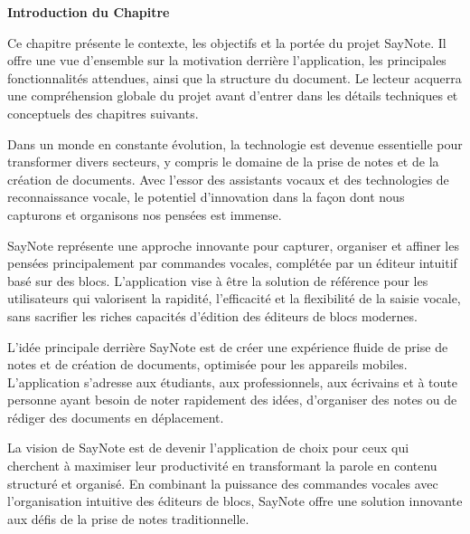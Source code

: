 
\begin{center}
\textbf{\large Introduction du Chapitre}
\end{center}

\noindent
Ce chapitre présente le contexte, les objectifs et la portée du projet SayNote. Il offre une vue d'ensemble sur la motivation derrière l'application, les principales fonctionnalités attendues, ainsi que la structure du document. Le lecteur acquerra une compréhension globale du projet avant d'entrer dans les détails techniques et conceptuels des chapitres suivants.

\thispagestyle{fancy}

\vspace{1cm}

Dans un monde en constante évolution, la technologie est devenue essentielle pour transformer divers secteurs, y compris le domaine de la prise de notes et de la création de documents. Avec l'essor des assistants vocaux et des technologies de reconnaissance vocale, le potentiel d'innovation dans la façon dont nous capturons et organisons nos pensées est immense.

SayNote représente une approche innovante pour capturer, organiser et affiner les pensées principalement par commandes vocales, complétée par un éditeur intuitif basé sur des blocs. L'application vise à être la solution de référence pour les utilisateurs qui valorisent la rapidité, l'efficacité et la flexibilité de la saisie vocale, sans sacrifier les riches capacités d'édition des éditeurs de blocs modernes.

\vspace{0.5cm}

L'idée principale derrière SayNote est de créer une expérience fluide de prise de notes et de création de documents, optimisée pour les appareils mobiles. L'application s'adresse aux étudiants, aux professionnels, aux écrivains et à toute personne ayant besoin de noter rapidement des idées, d'organiser des notes ou de rédiger des documents en déplacement.

\vspace{0.5cm}

La vision de SayNote est de devenir l'application de choix pour ceux qui cherchent à maximiser leur productivité en transformant la parole en contenu structuré et organisé. En combinant la puissance des commandes vocales avec l'organisation intuitive des éditeurs de blocs, SayNote offre une solution innovante aux défis de la prise de notes traditionnelle.

